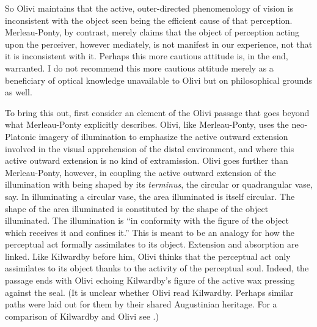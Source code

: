 So Olivi maintains that the active, outer-directed phenomenology of vision is inconsistent with the object seen being the efficient cause of that perception. Merleau-Ponty, by contrast, merely claims that the object of perception acting upon the perceiver, however mediately, is not manifest in our experience, not that it is inconsistent with it. Perhaps this more cautious attitude is, in the end, warranted. I do not recommend this more cautious attitude merely as a beneficiary of optical knowledge unavailable to Olivi but on philosophical grounds as well.

To bring this out, first consider an element of the Olivi passage that goes beyond what Merleau-Ponty explicitly describes. Olivi, like Merleau-Ponty, uses the neo-Platonic imagery of illumination to emphasize the active outward extension involved in the visual apprehension of the distal environment, and where this active outward extension is no kind of extramission. Olivi goes further than Merleau-Ponty, however, in coupling the active outward extension of the illumination with being shaped by its \emph{terminus}, the circular or quadrangular vase, say. In illuminating a circular vase, the area illuminated is itself circular. The shape of the area illuminated is constituted by the shape of the object illuminated. The illumination is ``in conformity with the figure of the object which receives it and confines it.'' This is meant to be an analogy for how the perceptual act formally assimilates to its object. Extension and absorption are linked. Like Kilwardby before him, Olivi thinks that the perceptual act only assimilates to its object thanks to the activity of the perceptual soul. Indeed, the passage ends with Olivi echoing Kilwardby's figure of the active wax pressing against the seal. (It is unclear whether Olivi read Kilwardby. Perhaps similar paths were laid out for them by their shared Augustinian heritage. For a comparison of Kilwardby and Olivi see \citealt{Silva:2014cl}.)


